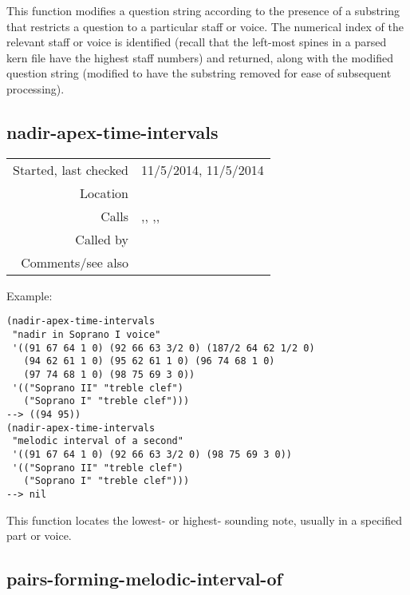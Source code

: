 \noindent This function modifies a question string
according to the presence of a substring that
restricts a question to a particular staff or voice.
The numerical index of the relevant staff or voice is
identified (recall that the left-most spines in a
parsed kern file have the highest staff numbers) and
returned, along with the modified question string
(modified to have the substring removed for ease of
subsequent processing).


\subsection*{nadir-apex-time-intervals}\label{fun:nadir-apex-time-intervals}

\vspace{0.3cm}
\begin{tabular}{r|p{8cm}}
Started, last checked & 11/5/2014, 11/5/2014 \\
Location & \nameref{sec:pitches-intervals-durations} \\
Calls & \nameref{fun:dataset-restricted-to-m-in-nth},\newline \nameref{fun:max-nth-argmax}, \nameref{fun:min-nth-argmin},\newline \nameref{fun:modify-question-by-staff-restriction},\newline \nameref{fun:replace-all} \\
Called by & \nameref{fun:Stravinsqi-Jun2014} \\
Comments/see also &
\end{tabular}

\vspace{0.5cm}
\noindent Example:
\begin{verbatim}
(nadir-apex-time-intervals
 "nadir in Soprano I voice"
 '((91 67 64 1 0) (92 66 63 3/2 0) (187/2 64 62 1/2 0)
   (94 62 61 1 0) (95 62 61 1 0) (96 74 68 1 0)
   (97 74 68 1 0) (98 75 69 3 0))
 '(("Soprano II" "treble clef")
   ("Soprano I" "treble clef")))
--> ((94 95))
(nadir-apex-time-intervals
 "melodic interval of a second"
 '((91 67 64 1 0) (92 66 63 3/2 0) (98 75 69 3 0))
 '(("Soprano II" "treble clef")
   ("Soprano I" "treble clef")))
--> nil
\end{verbatim}

\noindent This function locates the lowest- or highest-
sounding note, usually in a specified part or voice.


\subsection*{pairs-forming-melodic-interval-of}\label{fun:pairs-forming-melodic-interval-of}

